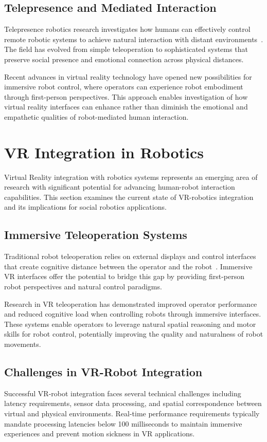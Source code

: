 \subsection{Telepresence and Mediated Interaction}
Telepresence robotics research investigates how humans can effectively control remote robotic systems to achieve natural interaction with distant environments~\cite{sheridan1992musings}. The field has evolved from simple teleoperation to sophisticated systems that preserve social presence and emotional connection across physical distances.

Recent advances in virtual reality technology have opened new possibilities for immersive robot control, where operators can experience robot embodiment through first-person perspectives. This approach enables investigation of how virtual reality interfaces can enhance rather than diminish the emotional and empathetic qualities of robot-mediated human interaction.

\section{VR Integration in Robotics}
Virtual Reality integration with robotics systems represents an emerging area of research with significant potential for advancing human-robot interaction capabilities. This section examines the current state of VR-robotics integration and its implications for social robotics applications.

\subsection{Immersive Teleoperation Systems}
Traditional robot teleoperation relies on external displays and control interfaces that create cognitive distance between the operator and the robot~\cite{sheridan1992musings}. Immersive VR interfaces offer the potential to bridge this gap by providing first-person robot perspectives and natural control paradigms.

Research in VR teleoperation has demonstrated improved operator performance and reduced cognitive load when controlling robots through immersive interfaces. These systems enable operators to leverage natural spatial reasoning and motor skills for robot control, potentially improving the quality and naturalness of robot movements.

\subsection{Challenges in VR-Robot Integration}
Successful VR-robot integration faces several technical challenges including latency requirements, sensor data processing, and spatial correspondence between virtual and physical environments. Real-time performance requirements typically mandate processing latencies below 100 milliseconds to maintain immersive experiences and prevent motion sickness in VR applications.

